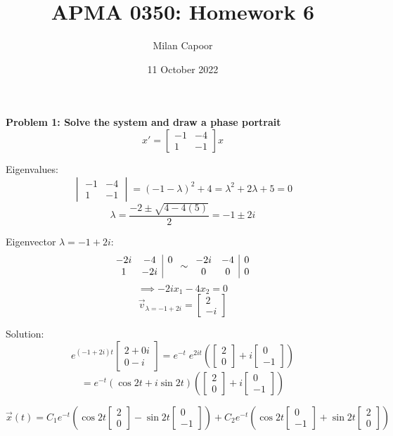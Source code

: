 \documentclass[12pt]{article}
\title{APMA 0350: Homework 6}
\author{Milan Capoor}
\date{11 October 2022}
\begin{document}
\maketitle

\textbf{Problem 1: Solve the system and draw a phase portrait}
\[x' = \begin{bmatrix}
    -1 & -4\\
    1 & -1
\end{bmatrix}x\]

Eigenvalues:
\[\begin{vmatrix}
    -1 & -4\\
    1 & -1
\end{vmatrix} = (-1 - \lambda)^2 + 4 = \lambda^2 + 2 \lambda + 5 = 0\]
\[\lambda = \frac{-2 \pm \sqrt{4- 4(5)}}{2} = -1 \pm 2i\]

Eigenvector $\lambda = -1 + 2i$:
\[\begin{array}{c c | c}
    -2i & -4 & 0\\
    1 & -2i    
\end{array} \sim \begin{array}{c c | c}
    -2i & -4 & 0\\
    0 & 0 & 0
\end{array}\]
\[\implies -2ix_1 - 4x_2 = 0\]
\[\vec{v}_{\lambda = -1 + 2i} = \begin{bmatrix}
    2\\
    -i
\end{bmatrix}\]

Solution:
\[e^{(-1 + 2i)t} \begin{bmatrix}
    2 + 0i\\
    0 - i
\end{bmatrix} = e^{-t}\; e^{2it} \left(\begin{bmatrix}
    2\\0
\end{bmatrix} + i\begin{bmatrix}
    0\\
    -1
\end{bmatrix}\right)\]
\[= e^{-t}\left(\cos 2t + i \sin 2t\right) \left(\begin{bmatrix}
    2\\0
\end{bmatrix} + i\begin{bmatrix}
    0\\
    -1
\end{bmatrix}\right)\]

\[\boxed{\vec{x}(t) = C_1 e^{-t} \left(\cos 2t \begin{bmatrix}
    2\\0
\end{bmatrix} - \sin 2t \begin{bmatrix}
    0\\-1
\end{bmatrix}\right) + C_2 e^{-t} \left(\cos 2t \begin{bmatrix}
    0\\-1
\end{bmatrix} + \sin 2t \begin{bmatrix}
    2\\0
\end{bmatrix}\right)}\]
\end{document}
